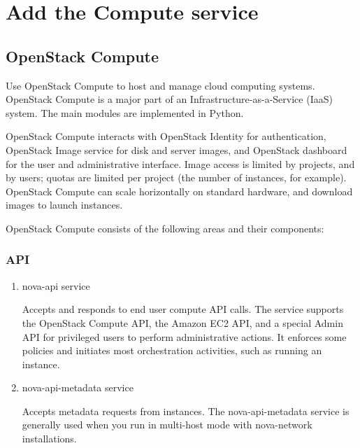 \section{Add the Compute service}
    \subsection{OpenStack Compute}
    \par Use OpenStack Compute to host and manage cloud computing systems. OpenStack Compute is a major part of an Infrastructure-as-a-Service (IaaS) system. The main modules are implemented in Python.
    
    \par OpenStack Compute interacts with OpenStack Identity for authentication, OpenStack Image service for disk and server images, and OpenStack dashboard for the user and administrative interface. Image access is limited by projects, and by users; quotas are limited per project (the number of instances, for example). OpenStack Compute can scale horizontally on standard hardware, and download images to launch instances.
    
    \par OpenStack Compute consists of the following areas and their components:
    
    \subsubsection{API}
        \begin{enumerate}
            \item nova-api service
            \par Accepts and responds to end user compute API calls. The service supports the OpenStack Compute API, the Amazon EC2 API, and a special Admin API for privileged users to perform administrative actions. It enforces some policies and initiates most orchestration activities, such as running an instance.
            
            \item nova-api-metadata service
            \par Accepts metadata requests from instances. The nova-api-metadata service is generally used when you run in multi-host mode with nova-network installations.
        \end{enumerate}
        
